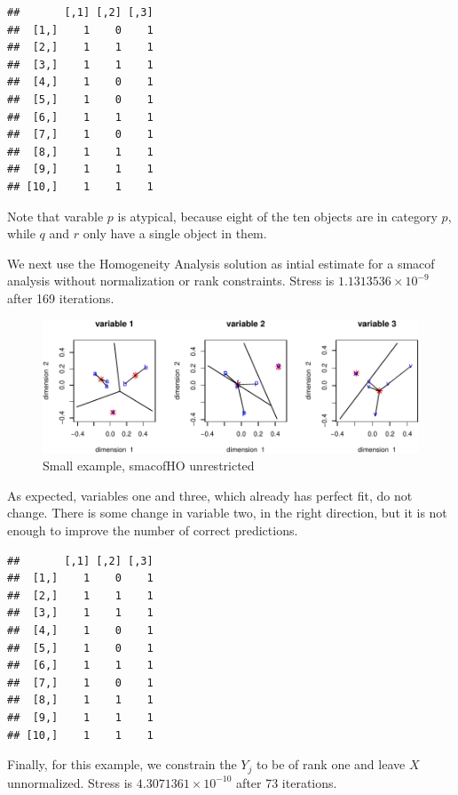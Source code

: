 \documentclass[
  12pt,
]{article}
\begin{document}
\begin{verbatim}
##       [,1] [,2] [,3]
##  [1,]    1    0    1
##  [2,]    1    1    1
##  [3,]    1    1    1
##  [4,]    1    0    1
##  [5,]    1    0    1
##  [6,]    1    1    1
##  [7,]    1    0    1
##  [8,]    1    1    1
##  [9,]    1    1    1
## [10,]    1    1    1
\end{verbatim}

Note that varable \(p\) is atypical, because eight of the ten objects
are in category \(p\), while \(q\) and \(r\) only have a single object
in them.

We next use the Homogeneity Analysis solution as intial estimate
for a smacof analysis without normalization or rank constraints.
Stress is \ensuremath{1.1313536\times 10^{-9}} after 169 iterations.

\begin{figure}

{\centering \includegraphics{smacofHO_files/figure-latex/smallplot00-1} 

}

\caption{Small example, smacofHO unrestricted}\label{fig:smallplot00}
\end{figure}

As expected, variables one and three, which already has perfect fit, do not change. There is some change in variable two, in the right
direction, but it is not enough to improve the number of correct
predictions.

\begin{verbatim}
##       [,1] [,2] [,3]
##  [1,]    1    0    1
##  [2,]    1    1    1
##  [3,]    1    1    1
##  [4,]    1    0    1
##  [5,]    1    0    1
##  [6,]    1    1    1
##  [7,]    1    0    1
##  [8,]    1    1    1
##  [9,]    1    1    1
## [10,]    1    1    1
\end{verbatim}

Finally, for this example, we constrain the \(Y_j\) to be of rank one
and leave \(X\) unnormalized. Stress is \ensuremath{4.3071361\times 10^{-10}} after 73 iterations.
\end{document}
